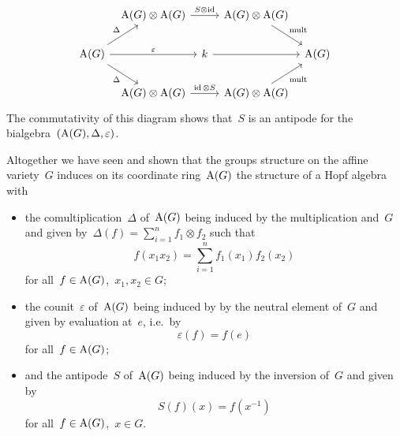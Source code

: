 \begin{fluff}
\begin{itemize}[resume]
\[        \begin{tikzcd}[column sep = tiny]
            {}
          & \coord(G) \tensor \coord(G)
            \arrow{rr}[above]{S \mathbin{\otimes} \id}
          & {}
          & \coord(G) \tensor \coord(G)
            \arrow{dr}[above right]{\text{mult}}
          & {}
          \\
            \coord(G)
            \arrow{ur}[above left]{\Delta}
            \arrow{rr}[above]{\varepsilon}
            \arrow{dr}[below left]{\Delta}
          & {}
          & k
            \arrow{rr}
          & {}
          & \coord(G)
          \\
            {}
          & \coord(G) \tensor \coord(G)
            \arrow{rr}[above]{\id \tensor S}
          & {}
          & \coord(G) \tensor \coord(G)
            \arrow{ur}[below right]{\text{mult}}
          & {}
        \end{tikzcd}
      \]
      The commutativity of this diagram shows that~$S$ is an antipode for the bialgebra~$(\operatorname{A}(G), \Delta, \varepsilon)$.
  \end{itemize}

  Altogether we have seen and shown that the groups structure on the affine variety~$G$ induces on its coordinate ring~$\operatorname{A}(G)$ the structure of a Hopf algebra with
  \begin{itemize}
    \item
      the comultiplication~$\Delta$ of~$\operatorname{A}(G)$ being induced by the multiplication and~$G$ and given by~$\Delta(f) = \sum_{i=1}^n f_1 \otimes f_2$ such that
      \begin{equation}
      \label{explicit description of comultiplication}
          f(x_1 x_2)
        = \sum_{i=1}^n f_1(x_1) f_2(x_2)
      \end{equation}
      for all~$f \in \operatorname{A}(G)$,~$x_1, x_2 \in G$;
    \item
      the counit~$\varepsilon$ of~$\operatorname{A}(G)$ being induced by by the neutral element of~$G$ and given by evaluation at~$e$, i.e.\ by
      \begin{equation}
      \label{explicit description of counit}
          \varepsilon(f)
        = f(e)
      \end{equation}
      for all~$f \in \operatorname{A}(G)$;
    \item
      and the antipode~$S$ of~$\operatorname{A}(G)$ being induced by the inversion of~$G$ and given by
      \begin{equation}
      \label{explicit description of antipode}
          S(f)(x)
        = f(x^{-1})
      \end{equation}
      for all~$f \in \operatorname{A}(G)$,~$x \in G$.
  \end{itemize}
\end{fluff}


